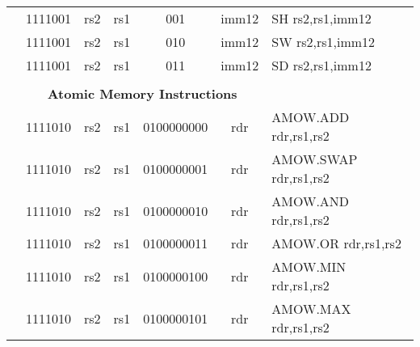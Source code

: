 \begin{table}[p]
\begin{small}
\begin{center}
\begin{tabular}{rcccccccccccl}
&
\multicolumn{2}{|c|}{1111001} &
\multicolumn{1}{c|}{rs2} &
\multicolumn{1}{c|}{rs1} &
\multicolumn{2}{c|}{001} &
\multicolumn{5}{c|}{imm12} & SH rs2,rs1,imm12 \\
\cline{2-12}
  

&
\multicolumn{2}{|c|}{1111001} &
\multicolumn{1}{c|}{rs2} &
\multicolumn{1}{c|}{rs1} &
\multicolumn{2}{c|}{010} &
\multicolumn{5}{c|}{imm12} & SW rs2,rs1,imm12 \\
\cline{2-12}
  

&
\multicolumn{2}{|c|}{1111001} &
\multicolumn{1}{c|}{rs2} &
\multicolumn{1}{c|}{rs1} &
\multicolumn{2}{c|}{011} &
\multicolumn{5}{c|}{imm12} & SD rs2,rs1,imm12 \\
\cline{2-12}
  

&
\multicolumn{11}{c}{} & \\
&
\multicolumn{11}{c}{\bf Atomic Memory Instructions} & \\
\cline{2-12}
  

&
\multicolumn{2}{|c|}{1111010} &
\multicolumn{1}{c|}{rs2} &
\multicolumn{1}{c|}{rs1} &
\multicolumn{6}{c|}{0100000000} &
\multicolumn{1}{c|}{rdr} & AMOW.ADD rdr,rs1,rs2 \\
\cline{2-12}
  

&
\multicolumn{2}{|c|}{1111010} &
\multicolumn{1}{c|}{rs2} &
\multicolumn{1}{c|}{rs1} &
\multicolumn{6}{c|}{0100000001} &
\multicolumn{1}{c|}{rdr} & AMOW.SWAP rdr,rs1,rs2 \\
\cline{2-12}
  

&
\multicolumn{2}{|c|}{1111010} &
\multicolumn{1}{c|}{rs2} &
\multicolumn{1}{c|}{rs1} &
\multicolumn{6}{c|}{0100000010} &
\multicolumn{1}{c|}{rdr} & AMOW.AND rdr,rs1,rs2 \\
\cline{2-12}
  

&
\multicolumn{2}{|c|}{1111010} &
\multicolumn{1}{c|}{rs2} &
\multicolumn{1}{c|}{rs1} &
\multicolumn{6}{c|}{0100000011} &
\multicolumn{1}{c|}{rdr} & AMOW.OR rdr,rs1,rs2 \\
\cline{2-12}
  

&
\multicolumn{2}{|c|}{1111010} &
\multicolumn{1}{c|}{rs2} &
\multicolumn{1}{c|}{rs1} &
\multicolumn{6}{c|}{0100000100} &
\multicolumn{1}{c|}{rdr} & AMOW.MIN rdr,rs1,rs2 \\
\cline{2-12}
  

&
\multicolumn{2}{|c|}{1111010} &
\multicolumn{1}{c|}{rs2} &
\multicolumn{1}{c|}{rs1} &
\multicolumn{6}{c|}{0100000101} &
\multicolumn{1}{c|}{rdr} & AMOW.MAX rdr,rs1,rs2 \\
\cline{2-12}
  


\end{tabular}
\end{center}
\end{small}
\end{table}
